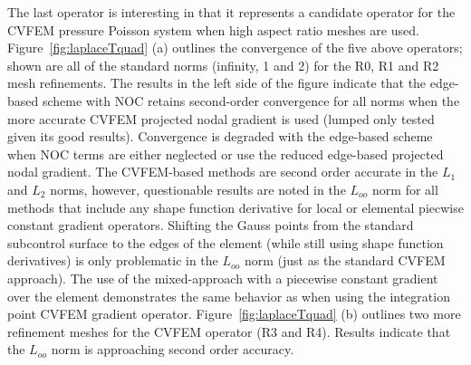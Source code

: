 The last operator is interesting in that it represents a candidate operator for the CVFEM pressure Poisson system when high aspect ratio 
meshes are used. Figure~\ref{fig:laplaceTquad} (a) outlines the convergence of the five above operators; shown are all of the standard 
norms (infinity, 1 and 2) for the R0, R1 and R2 mesh refinements. The results in the left side of the figure indicate that the edge-based 
scheme with NOC retains second-order convergence for all norms when the more accurate CVFEM projected nodal gradient is used (lumped only tested 
given its good results). Convergence is degraded with the edge-based scheme when NOC terms are either neglected or use the reduced edge-based 
projected nodal gradient. The CVFEM-based methods are second order accurate in the $L_1$ and $L_2$ norms, however, questionable 
results are noted in the $L_{oo}$ norm for all methods that include any shape function derivative for local or elemental piecwise constant 
gradient operators. Shifting the Gauss points from the standard subcontrol surface to the edges of the element (while still using shape function derivatives) 
is only problematic in the $L_{oo}$ norm (just as the standard CVFEM approach). The use of the mixed-approach with a piecewise constant gradient over the 
element demonstrates the same behavior as when using the integration point CVFEM gradient operator. Figure~\ref{fig:laplaceTquad} (b) outlines two more refinement meshes 
for the CVFEM operator (R3 and R4). Results indicate that the $L_{oo}$ norm is approaching second order accuracy.

